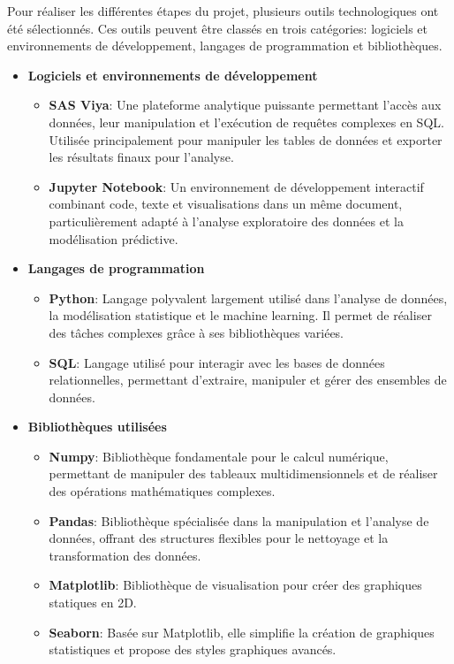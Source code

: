 Pour réaliser les différentes étapes du projet, plusieurs outils technologiques ont été sélectionnés. Ces outils peuvent être classés en trois catégories: logiciels et environnements de développement, langages de programmation et bibliothèques.

\begin{itemize}
    \item \textbf{Logiciels et environnements de développement}  
    \begin{itemize}
        \item \textbf{SAS Viya}: Une plateforme analytique puissante permettant l'accès aux données, leur manipulation et l'exécution de requêtes complexes en SQL. Utilisée principalement pour manipuler les tables de données et exporter les résultats finaux pour l'analyse.
        \item \textbf{Jupyter Notebook}: Un environnement de développement interactif combinant code, texte et visualisations dans un même document, particulièrement adapté à l'analyse exploratoire des données et la modélisation prédictive.   
    \end{itemize}
    \item \textbf{Langages de programmation}  
    \begin{itemize}
        \item \textbf{Python}: Langage polyvalent largement utilisé dans l'analyse de données, la modélisation statistique et le machine learning. Il permet de réaliser des tâches complexes grâce à ses bibliothèques variées.
        \item \textbf{SQL}: Langage utilisé pour interagir avec les bases de données relationnelles, permettant d'extraire, manipuler et gérer des ensembles de données.
    \end{itemize}
    \item \textbf{Bibliothèques utilisées}  
    \begin{itemize}
        \item \textbf{Numpy}: Bibliothèque fondamentale pour le calcul numérique, permettant de manipuler des tableaux multidimensionnels et de réaliser des opérations mathématiques complexes.
        \item \textbf{Pandas}: Bibliothèque spécialisée dans la manipulation et l'analyse de données, offrant des structures flexibles pour le nettoyage et la transformation des données.
        \item \textbf{Matplotlib}: Bibliothèque de visualisation pour créer des graphiques statiques en 2D.
        \item \textbf{Seaborn}: Basée sur Matplotlib, elle simplifie la création de graphiques statistiques et propose des styles graphiques avancés.

\end{itemize}
\end{itemize}
